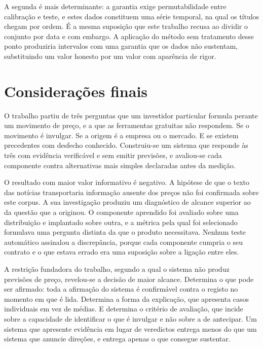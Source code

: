 A segunda é mais determinante: a garantia exige
permutabilidade entre calibração e teste, e estes dados constituem uma série temporal, na qual os
títulos chegam por ordem. É a mesma suposição que este trabalho recusa ao dividir o conjunto por data
e com embargo. A aplicação do método sem tratamento desse ponto produziria intervalos com uma
garantia que os dados não sustentam, substituindo um valor honesto por um valor com aparência de
rigor.

\section{Considerações finais}
\label{sec:con_final}

O trabalho partiu de três perguntas que um investidor particular formula perante um movimento de
preço, e a que as ferramentas gratuitas não respondem. Se o movimento é invulgar. Se a origem é a
empresa ou o mercado. E se existem precedentes com desfecho conhecido. Construiu-se um
sistema que responde às três com evidência verificável e sem emitir previsões, e avaliou-se cada
componente contra alternativas mais simples declaradas antes da medição.

O resultado com maior valor informativo é negativo. A hipótese de que o texto das notícias transportaria informação ausente dos preços não foi
confirmada sobre este corpus. A sua investigação produziu um diagnóstico de alcance superior ao da
questão que a originou. O componente aprendido foi avaliado sobre uma distribuição e implantado
sobre outra, e a métrica pela qual foi selecionado formulava uma pergunta distinta da que o
produto necessitava. Nenhum
teste automático assinalou a discrepância, porque cada componente cumpria o seu contrato e o que
estava errado era uma suposição sobre a ligação entre eles.

A restrição fundadora do trabalho, segundo a qual o sistema não produz previsões de preço, revelou-se
a decisão de maior alcance. Determina o que pode ser afirmado: toda a afirmação do sistema é confirmável contra o registo no
momento em que é lida. Determina a forma da explicação, que apresenta casos individuais em vez de
médias. E determina o critério de avaliação, que incide sobre a capacidade de identificar o que é
invulgar e não sobre a de antecipar. Um sistema que apresente evidência em lugar de veredictos entrega menos do que um sistema
que anuncie direções, e entrega apenas o que consegue sustentar.

